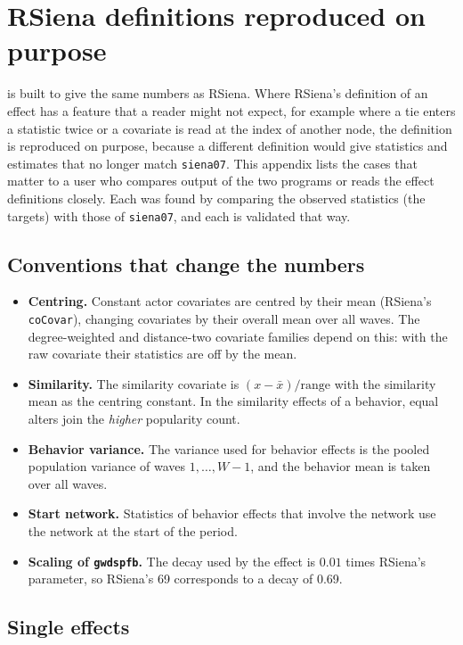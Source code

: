 \chapter{RSiena definitions reproduced on purpose}\label{app:quirks}

\nwsaom{} is built to give the same numbers as RSiena. Where RSiena's
definition of an effect has a feature that a reader might not expect, for example
where a tie enters a statistic twice or a covariate is read at the index of another
node, the definition is reproduced on purpose, because a different definition
would give statistics and estimates that no longer
match \texttt{siena07}. This appendix lists the cases that matter to a user who
compares output of the two programs or reads the effect definitions closely.
Each was found by comparing the observed statistics (the targets) with those of
\texttt{siena07}, and each is validated that way.

\section*{Conventions that change the numbers}

\begin{itemize}
\item \textbf{Centring.} Constant actor covariates are centred by their mean
  (RSiena's \texttt{coCovar}), changing covariates by their overall mean over
  all waves. The degree-weighted and distance-two covariate families depend on
  this: with the raw covariate their statistics are off by the mean.
\item \textbf{Similarity.} The similarity covariate is
  $(x-\bar x)/\text{range}$ with the similarity mean as the centring constant.
  In the similarity effects of a behavior, equal alters join the \emph{higher}
  popularity count.
\item \textbf{Behavior variance.} The variance used for behavior effects is the
  pooled population variance of waves $1,\dots,W-1$, and the behavior mean is
  taken over all waves.
\item \textbf{Start network.} Statistics of behavior effects that involve the
  network use the network at the start of the period.
\item \textbf{Scaling of \texttt{gwdspfb}.} The decay used by the effect is
  $0.01$ times RSiena's parameter, so RSiena's 69 corresponds to a decay
  of 0.69.
\end{itemize}

\section*{Single effects}

